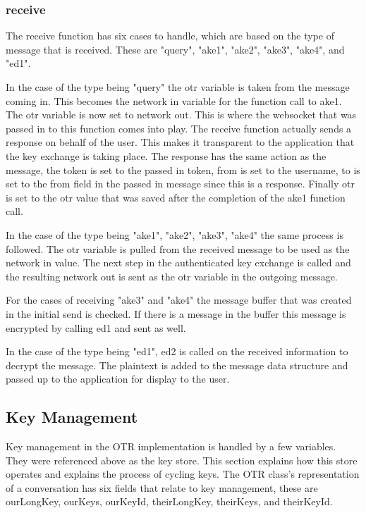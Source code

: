 \subsubsection{receive}


The receive function has six cases to handle, which are based on the type of message that is received. These are "query", "ake1", "ake2", "ake3", "ake4", and "ed1".


In the case of the type being "query" the otr variable is taken from the message coming in. This becomes the network in variable for the function call to ake1. The otr variable is now set to network out. This is where the websocket that was passed in to this function comes into play. The receive function actually sends a response on behalf of the user. This makes it transparent to the application that the key exchange is taking place. The response has the same action as the message, the token is set to the passed in token, from is set to the username, to is set to the from field in the passed in message since this is a response. Finally otr is set to the otr value that was saved after the completion of the ake1 function call.


In the case of the type being "ake1", "ake2", "ake3", "ake4" the same process is followed. The otr variable is pulled from the received message to be used as the network in value. The next step in the authenticated key exchange is called and the resulting network out is sent as the otr variable in the outgoing message.


For the cases of receiving "ake3" and "ake4" the message buffer that was created in the initial send is checked. If there is a message in the buffer this message is encrypted by calling ed1 and sent as well. 


In the case of the type being "ed1", ed2 is called on the received information to decrypt the message. The plaintext is added to the message data structure and passed up to the application for display to the user.


\subsection{Key Management}


Key management in the OTR implementation is handled by a few variables. They were referenced above as the key store. This section explains how this store operates and explains the process of cycling keys. The OTR class's representation of a conversation has six fields that relate to key management, these are ourLongKey, ourKeys, ourKeyId, theirLongKey, theirKeys, and theirKeyId. 


